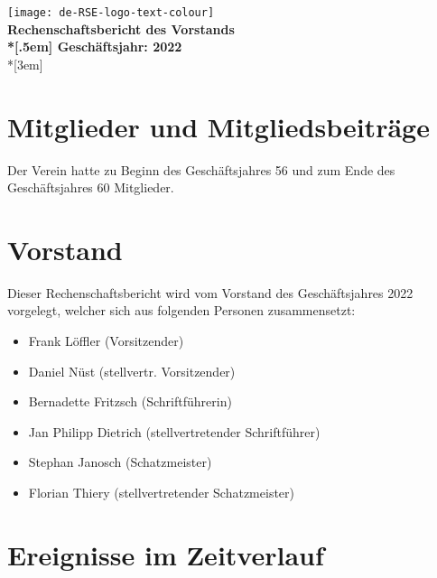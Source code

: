 \newcommand{\jahr}{2022}



\thispagestyle{empty}

\begin{centering}
\texttt{[image: de-RSE-logo-text-colour]}\\
\vspace{3em}
\textbf{
 \Large Rechenschaftsbericht des Vorstands\\*[.5em]
 \normalsize Geschäftsjahr: \jahr}\\*[3em]
\end{centering}

\section{Mitglieder und Mitgliedsbeiträge}

Der Verein hatte zu Beginn des Geschäftsjahres 56 und zum Ende des Geschäftsjahres 60 Mitglieder.

\section{Vorstand}

Dieser Rechenschaftsbericht wird vom Vorstand des Geschäftsjahres 2022 vorgelegt, welcher sich aus folgenden Personen zusammensetzt:

\begin{itemize}
  \setlength{\itemsep}{0pt plus 1pt}
  \item Frank Löffler (Vorsitzender)
  \item Daniel Nüst (stellvertr. Vorsitzender)
  \item Bernadette Fritzsch (Schriftführerin)
  \item Jan Philipp Dietrich (stellvertretender Schriftführer)
  \item Stephan Janosch (Schatzmeister)
  \item Florian Thiery (stellvertretender Schatzmeister)
\end{itemize}

\section{Ereignisse im Zeitverlauf}

